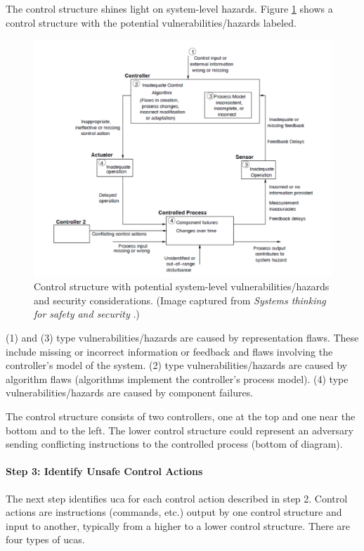 \documentclass[../../main/main.tex]{subfiles}
\begin{document}
The control structure shines light on system-level hazards.  Figure \ref{stpasecControlStructure} shows a control structure with the potential vulnerabilities/hazards labeled.
\begin{figure}[h]
\includegraphics[width=\linewidth]{../figures/stpasecControlStructure}
\caption{\label{stpasecControlStructure} Control structure with potential system-level vulnerabilities/hazards and security considerations. (Image captured from  \textit{Systems thinking for safety and security} \cite{sys4sec}.)}
\end{figure}

(1) and (3) type vulnerabilities/hazards are caused by representation flaws.  These include missing or incorrect information or feedback and flaws involving the controller's model of the system.  (2) type vulnerabilities/hazards are caused by algorithm flaws (algorithms implement the controller's process model).  (4) type vulnerabilities/hazards are caused by component failures.

The control structure consists of two controllers, one at the top and one near the bottom and to the left.  The lower control structure could represent an adversary sending conflicting instructions to the controlled process (bottom of diagram).  

\paragraph*{Step 3: Identify Unsafe Control Actions}
The next step identifies \gls{uca} for each control action described in step 2. Control actions are instructions (commands, etc.) output by one control structure and input to another, typically from a higher to a lower control structure.   There are four types of \gls{uca}s.
\end{document}
